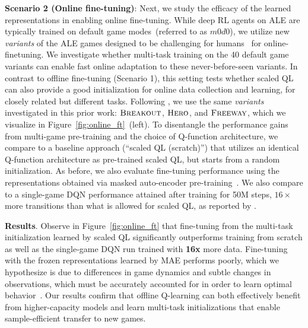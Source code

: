 \textbf{Scenario 2 (Online fine-tuning)}: Next, we study the efficacy of the learned representations in enabling online fine-tuning. While deep RL agents on ALE are typically trained on default game modes~(referred to as $m0d0$), we utilize new \emph{variants} of the ALE games designed to be challenging for humans~\citep{machado18sticky} for online-finetuning. We investigate whether multi-task training on the 40 default game variants can enable fast online adaptation to these never-before-seen variants. In contrast to offline fine-tuning (Scenario 1), this setting tests whether scaled QL can also provide a good initialization for online data collection and learning, for closely related but different tasks. Following \citet{farebrother2018generalization}, we use the same \emph{variants} investigated in this prior work: $\textsc{Breakout}$, $\textsc{Hero}$, and $\textsc{Freeway}$, which we visualize in Figure~\ref{fig:online_ft}~(left).
To disentangle the performance gains from multi-game pre-training and the choice of Q-function architecture, we compare to a baseline approach (``scaled QL (scratch)'') that utilizes an identical Q-function architecture as pre-trained scaled QL, but starts from a random initialization. As before, we also evaluate fine-tuning performance using the representations obtained via masked auto-encoder pre-training~\citep{he2111masked,xiao2022masked}. We also compare to a single-game DQN performance attained after training for 50M steps, $16\times$ more transitions than what is allowed for scaled QL, as reported by \citet{farebrother2018generalization}.

\textbf{Results}. Observe in Figure~\ref{fig:online_ft} that fine-tuning from the multi-task initialization learned by scaled QL significantly outperforms training from scratch as well as the single-game DQN run trained with \textbf{16x} more data. Fine-tuning with the frozen representations learned by MAE performs poorly, which we hypothesize is due to differences in game dynamics and subtle changes in observations, which must be accurately accounted for in order to learn optimal behavior~\citep{dean2022don}. Our results confirm that offline Q-learning can both effectively benefit from higher-capacity models and learn multi-task initializations that enable sample-efficient transfer to new games. 



